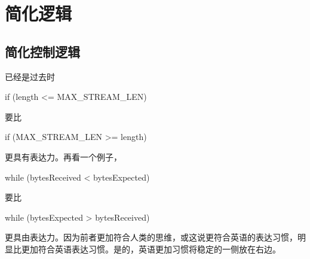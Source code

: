 \begin{savequote}[45mm]
\end{savequote}

\chapter{简化逻辑}
\label{ch:simple-logic}

\section{简化控制逻辑}

\begin{content}

\begin{regulation}
已经是过去时
\end{regulation}

\begin{leftbar}
\begin{c++}
if (length <= MAX_STREAM_LEN)
\end{c++}
\end{leftbar}

要比

\begin{leftbar}
\begin{c++}
if (MAX_STREAM_LEN >= length)
\end{c++}
\end{leftbar}

更具有表达力。再看一个例子，

\begin{leftbar}
\begin{c++}
while (bytesReceived < bytesExpected)
\end{c++}
\end{leftbar}

要比

\begin{leftbar}
\begin{c++}
while (bytesExpected > bytesReceived)
\end{c++}
\end{leftbar}

更具由表达力。因为前者更加符合人类的思维，或这说更符合英语的表达习惯，明显比更加符合英语表达习惯。是的，英语更加习惯将稳定的一侧放在右边。


\end{content}

